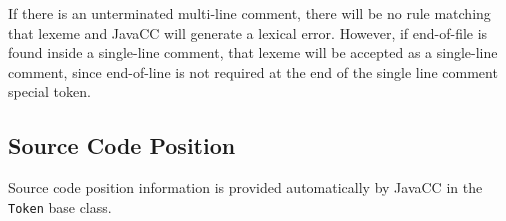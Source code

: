 \documentclass[a4paper,11pt]{article}
\begin{document}
If there is an unterminated multi-line comment, there will be no rule matching
that lexeme and JavaCC will generate a lexical error. However, if end-of-file is
found inside a single-line comment, that lexeme will be accepted as a
single-line comment, since end-of-line is not required at the end of the single
line comment special token.

\subsection{Source Code Position}
Source code position information is provided automatically by JavaCC in the
\texttt{Token} base class.
\end{document}
